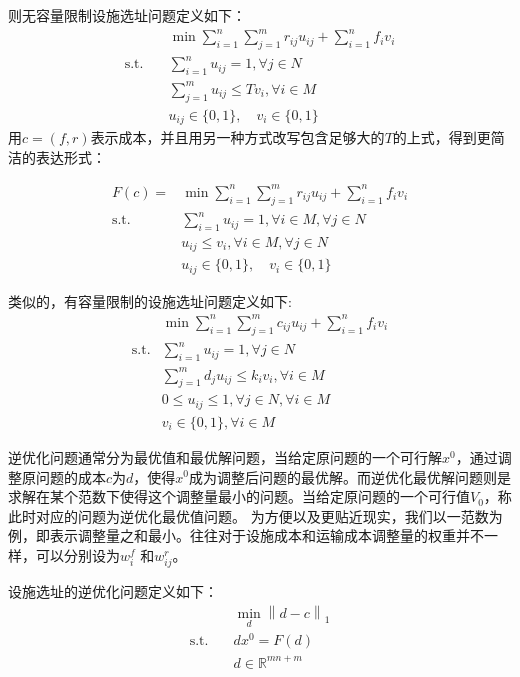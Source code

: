 \documentclass[UTF8]{article}
\begin{document}
则无容量限制设施选址问题定义如下：
\begin{align*}
&\min \sum_{i=1}^n \sum_{j=1}^m r_{ij}u_{ij} + \sum_{i=1}^n f_i v_i \\
\text{s.t.}\quad & \sum_{i=1}^n u_{ij} =1, \forall j \in N  \\
&\sum_{j=1}^m u_{ij}  \leq Tv_i, \forall i \in M \\
& u_{ij} \in \{0,1\}, \quad v_{i} \in \{0,1\}
\end{align*}
用$c=(f,r)$表示成本，并且用另一种方式改写包含足够大的$T$的上式，得到更简洁的表达形式：

\begin{align*}
F(c) = &\min \sum_{i=1}^n \sum_{j=1}^m r_{ij}u_{ij} + \sum_{i=1}^n f_i v_i \\
\text{s.t.}\quad & \sum_{i=1}^n u_{ij} =1,\forall i \in M, \forall j \in N  \\
& u_{ij}  \leq v_i, \forall i \in M ,\forall j \in N\\
& u_{ij} \in \{0,1\}, \quad v_{i} \in \{0,1\}
\end{align*}

类似的，有容量限制的设施选址问题定义如下:
\begin{align*}
&\min \sum_{i=1}^n \sum_{j=1}^m c_{ij}u_{ij} + \sum_{i=1}^n f_i v_i \\
\text{s.t.}& \sum_{i=1}^n u_{ij} =1, \forall j \in N  \\
&\sum_{j=1}^m d_j u_{ij}  \leq k_iv_i, \forall i \in M \\
& 0 \leq u_{ij} \leq 1,\forall j \in N, \forall i \in M \\
& v_{i} \in \{0,1\}, \forall i \in M
\end{align*}

逆优化问题通常分为最优值和最优解问题，当给定原问题的一个可行解$x^0$，通过调整原问题的成本$c$为$d$，使得$x^0$成为调整后问题的最优解。而逆优化最优解问题则是求解在某个范数下使得这个调整量最小的问题。当给定原问题的一个可行值$V_0$，称此时对应的问题为逆优化最优值问题。
为方便以及更贴近现实，我们以一范数为例，即表示调整量之和最小。往往对于设施成本和运输成本调整量的权重并不一样，可以分别设为$w_i^f$ 和$w_{ij}^r$。



设施选址的逆优化问题定义如下：
\begin{align*}
&\min_{d} \left\|d-c\right\|_1 \\
\text{s.t.}\quad & dx^0 = F(d) \\
& d \in \mathbb{R}^{mn+m}
\end{align*}
\end{document}
